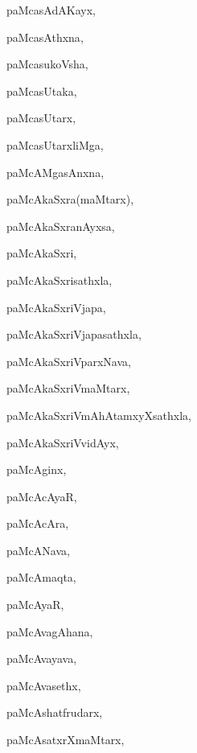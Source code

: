 \begin{multicols}{3}
{\noindent
{paMcasAdAKayx}, \pageref{paMcasAdAKayx}

\noindent
{paMcasAthxna}, \pageref{paMcasAthxna}

\noindent
{paMcasukoVsha}, \pageref{paMcasukoVsha}

\noindent
{paMcasUtaka}, \pageref{paMcasUtaka}

\noindent
{paMcasUtarx}, \pageref{paMcasUtarx}

\noindent
{paMcasUtarxliMga}, \pageref{paMcasUtarxliMga}

\noindent
{paMcAMgasAnxna}, \pageref{paMcAMgasAnxna}

\noindent
{paMcAkaSxra(maMtarx)}, \pageref{paMcAkaSxramaMtarx}

\noindent
{paMcAkaSxranAyxsa}, \pageref{paMcAkaSxranAyxsa}

\noindent
{paMcAkaSxri}, \pageref{paMcAkaSxri}

\noindent
{paMcAkaSxrisathxla}, \pageref{paMcAkaSxrisathxla}

\noindent
{paMcAkaSxriVjapa}, \pageref{paMcAkaSxriVjapa}

\noindent
{paMcAkaSxriVjapasathxla}, \pageref{paMcAkaSxriVjapasathxla}

\noindent
{paMcAkaSxriVparxNava}, \pageref{paMcAkaSxriVparxNava}

\noindent
{paMcAkaSxriVmaMtarx}, \pageref{paMcAkaSxriVmaMtarx}

\noindent
{paMcAkaSxriVmAhAtamxyXsathxla}, \pageref{paMcAkaSxriVmAhAtamxyXsathxla}

\noindent
{paMcAkaSxriVvidAyx}, \pageref{paMcAkaSxriVvidAyx}

\noindent
{paMcAginx}, \pageref{paMcAginx}

\noindent
{paMcAcAyaR}, \pageref{paMcAcAyaR}

\noindent
{paMcAcAra}, \pageref{paMcAcAra}

\noindent
{paMcANava}, \pageref{paMcANava}

\noindent
{paMcAmaqta}, \pageref{paMcAmaqta}

\noindent
{paMcAyaR}, \pageref{paMcAyaR}

\noindent
{paMcAvagAhana}, \pageref{paMcAvagAhana}

\noindent
{paMcAvayava}, \pageref{paMcAvayava}

\noindent
{paMcAvasethx}, \pageref{paMcAvasethx}

\noindent
{paMcAshatfrudarx}, \pageref{paMcAshatfrudarx}

\noindent
{paMcAsatxrXmaMtarx}, \pageref{paMcAsatxrXmaMtarx}

}
\end{multicols}
